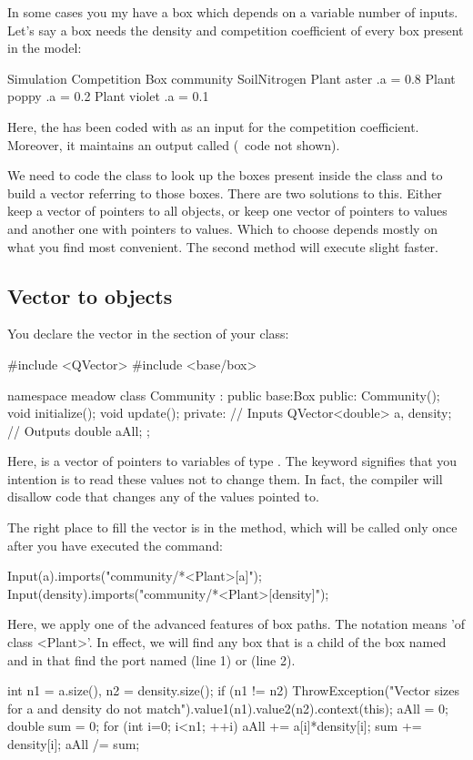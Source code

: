 In some cases you my have a box which depends on a variable number of inputs. Let's say a  box needs the density and competition coefficient of every  box present in the model:

Simulation {
  Competition {
  }
  Box community {
    SoilNitrogen {
    }
    Plant aster {
      .a = 0.8
    }
    Plant poppy {
      .a = 0.2
    }
    Plant violet {
      .a = 0.1
    }
  }
}

Here, the  has been coded with  as an input for the competition coefficient. Moreover, it maintains an output called  (\CPP\ code not shown).

We need to code the  class to look up the  boxes present inside the  class and to build a vector referring to those  boxes. There are two solutions to this. Either keep a vector of pointers to all  objects, or keep one vector of pointers to  values and another one with pointers to  values. Which to choose depends mostly on what you find most convenient. The second method will execute slight faster.

\subsection{Vector to \protect{}objects}
You declare the vector in the  section of your class:

#include <QVector>
#include <base/box>

namespace meadow {
	class Community : public base:Box {
	public:
	Community();
	void initialize();
	void update();
	private:
	// Inputs
	QVector<double> a, density;
	// Outputs
	double aAll;
	};
}

Here,  is a vector of pointers to variables of type . The  keyword signifies that you intention is to read these values not to change them. In fact, the compiler will disallow code that changes any of the values pointed to.

The right place to fill the  vector is in the  method, which will be called only once after you have executed the  command:

Input(a).imports("community/*<Plant>[a]");
Input(density).imports("community/*<Plant>[density]");

Here, we apply one of the advanced features of box paths. The  notation means 'of class \code<Plant>'. In effect, we will find any box that is a child of the box named  and in that find the port named  (line 1) or  (line 2).

int n1 = a.size(), 
    n2 = density.size();
if (n1 != n2) 
	ThrowException("Vector sizes for a and density do not match").value1(n1).value2(n2).context(this);
aAll = 0;
double sum = 0;
for (int i=0; i<n1; ++i) {
	aAll += a[i]*density[i];
	sum += density[i];
}
aAll /= sum;
